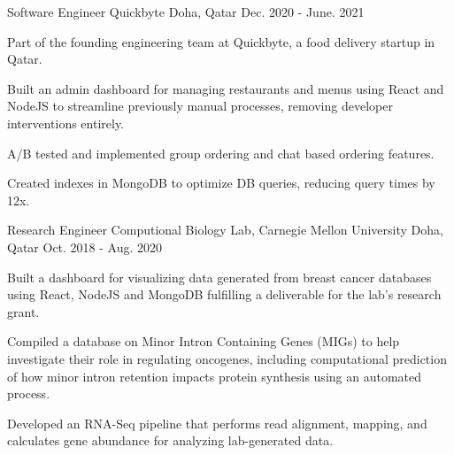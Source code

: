 \begin{cventries}
  \cventry
    {Software Engineer} %
    {Quickbyte} %
    {Doha, Qatar} %
    {Dec. 2020 - June. 2021} %
    {
      \begin{cvitems} %
        \item {Part of the founding engineering team at Quickbyte, a food delivery startup in Qatar.}
        \item {Built an admin dashboard for managing restaurants and menus using React and NodeJS to streamline previously manual processes, removing developer interventions entirely.}
        \item {A/B tested and implemented group ordering and chat based ordering features.}
        \item {Created indexes in MongoDB to optimize DB queries, reducing query times by 12x.}
      \end{cvitems}
    }

  \cventry
    {Research Engineer} %
    {Computional Biology Lab, Carnegie Mellon University} %
    {Doha, Qatar} %
    {Oct. 2018 - Aug. 2020} %
    {
      \begin{cvitems} %
        \item {Built a dashboard for visualizing data generated from breast cancer databases using React, NodeJS and MongoDB fulfilling a deliverable for the lab's research grant.}
        \item {Compiled a database on Minor Intron Containing Genes (MIGs) to help investigate their role in regulating oncogenes, including computational prediction of how minor intron retention impacts protein synthesis using an automated process.}
        \item {Developed an RNA-Seq pipeline that performs read alignment, mapping, and calculates gene abundance for analyzing lab-generated data.}
      \end{cvitems}
    }

\end{cventries}
